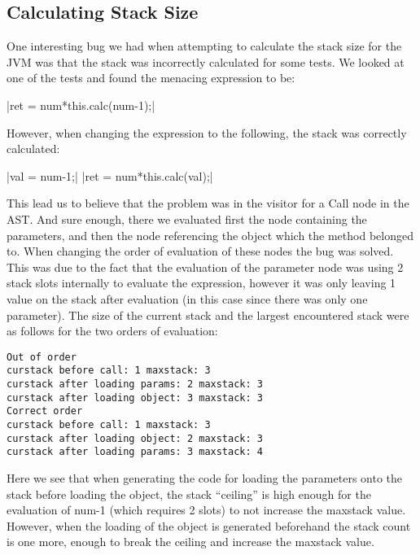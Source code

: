 \documentclass[paper=a4, fontsize=11pt]{scrartcl} %
\numberwithin{equation}{section} %
\numberwithin{figure}{section} %
\numberwithin{table}{section} %
\begin{document}
\subsection*{Calculating Stack Size}
One interesting bug we had when attempting to calculate the stack size for the JVM was that the stack was incorrectly calculated for some tests. We looked at one of the tests and found the menacing expression to be:

|ret = num*this.calc(num-1);|

However, when changing the expression to the following, the stack was correctly calculated:

|val = num-1;|
|ret = num*this.calc(val);|

This lead us to believe that the problem was in the visitor for a Call node in the AST. And sure enough, there we evaluated first the node containing the parameters, and then the node referencing the object which the method belonged to. When changing the order of evaluation of these nodes the bug was solved. This was due to the fact that the evaluation of the parameter node was using 2 stack slots internally to evaluate the expression, however it was only leaving 1 value on the stack after evaluation (in this case since there was only one parameter). The size of the current stack and the largest encountered stack were as follows for the two orders of evaluation:

\begin{verbatim}
Out of order
curstack before call: 1 maxstack: 3
curstack after loading params: 2 maxstack: 3
curstack after loading object: 3 maxstack: 3
Correct order
curstack before call: 1 maxstack: 3
curstack after loading object: 2 maxstack: 3
curstack after loading params: 3 maxstack: 4
\end{verbatim}

Here we see that when generating the code for loading the parameters onto the stack before loading the object, the stack “ceiling” is high enough for the evaluation of num-1 (which requires 2 slots) to not increase the maxstack value. However, when the loading of the object is generated beforehand the stack count is one more, enough to break the ceiling and increase the maxstack value.
\end{document}

